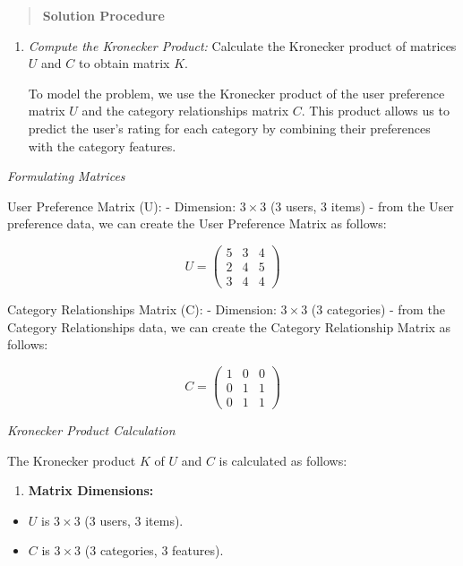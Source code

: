 \documentclass[
  letterpaper,
  DIV=11,
  numbers=noendperiod]{scrreprt}
\providecommand{\tightlist}{%
  \setlength{\itemsep}{0pt}\setlength{\parskip}{0pt}}\usepackage{longtable,booktabs,array}
\theoremstyle{plain}
\theoremstyle{definition}
\theoremstyle{remark}
\begin{document}
\begin{quote}
\textbf{Solution Procedure}
\end{quote}

\begin{enumerate}
\def\labelenumi{\arabic{enumi}.}
\item
  \emph{Compute the Kronecker Product:} Calculate the Kronecker product
  of matrices \(U\) and \(C\) to obtain matrix \(K\).

  To model the problem, we use the Kronecker product of the user
  preference matrix \(U\) and the category relationships matrix \(C\).
  This product allows us to predict the user's rating for each category
  by combining their preferences with the category features.
\end{enumerate}

\emph{Formulating Matrices}

User Preference Matrix (U): - Dimension: \(3\times 3\) (3 users, 3
items) - from the User preference data, we can create the User
Preference Matrix as follows:

\[U = \begin{pmatrix}5 & 3 & 4 \\2 & 4 & 5 \\3 & 4 & 4 \end{pmatrix}\]

Category Relationships Matrix (C): - Dimension: \(3 \times 3\) (3
categories) - from the Category Relationships data, we can create the
Category Relationship Matrix as follows:

\[C = \begin{pmatrix}1 & 0 & 0 \\ 0 & 1 & 1 \\ 0 & 1 & 1\end{pmatrix}\]

\emph{Kronecker Product Calculation}

The Kronecker product \(K\) of \(U\) and \(C\) is calculated as follows:

\begin{enumerate}
\def\labelenumi{\arabic{enumi}.}
\tightlist
\item
  \textbf{Matrix Dimensions:}
\end{enumerate}

\begin{itemize}
\tightlist
\item
  \(U\) is \(3 \times 3\) (3 users, 3 items).
\item
  \(C\) is \(3 \times 3\) (3 categories, 3 features).
\end{itemize}
\end{document}
